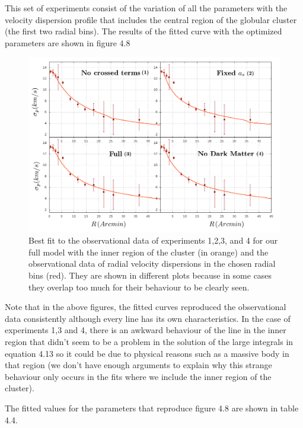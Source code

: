 This set of experiments consist of the variation of all the parameters with the velocity dispersion profile that includes the central region of the globular cluster (the first two radial bins). The results of the fitted curve with the optimized parameters are shown in figure 4.8

\begin{figure}[H]
\centering
\includegraphics[width=15cm]{images/all_params_refinado_12.png}
\caption[Best fit of the full model with the inner region]{Best fit to the observational data of experiments 1,2,3, and 4 for our full model with the inner region of the cluster (in orange) and the observational data of radial velocity dispersions in the chosen radial bins (red). They are shown in different plots because in some cases they overlap too much for their behaviour to be clearly seen.}

\end{figure}

Note that in the above figures, the fitted curves reproduced the observational data consistently although every line has its own characteristics. In the case of experiments 1,3 and 4, there is an awkward behaviour of the line in the inner region that didn't seem to be a problem in the solution of the large integrals in equation 4.13 so it could be due to physical reasons such as a massive body in that region (we don't have enough arguments to explain why this strange behaviour only occurs in the fits where we include the inner region of the cluster). 

The fitted values for the parameters that reproduce figure 4.8 are shown in table 4.4.

